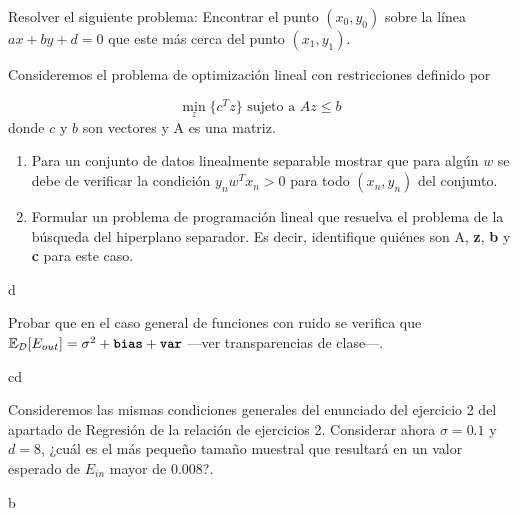 \documentclass[a4paper, 11pt]{article}
\begin{document}
      \begin{ejercicio}
        Resolver el siguiente problema: Encontrar el punto $(x_0,y_0)$ sobre la línea $ax+by+d=0$ que este más cerca del punto $(x_1,y_1)$.
        \item Consideremos el problema de optimización lineal con restricciones definido por

        \[
        \min_z \{c^Tz\} \textrm{ sujeto a } Az \leq b
        \]
        donde $c$ y $b$ son vectores y A es una matriz.

             \begin{enumerate}
                \item Para un conjunto de datos linealmente separable mostrar que para algún $w$ se debe de verificar la condición  $y_n w^T x_n > 0$ para todo $(x_n,y_n)$ del conjunto.
                \item Formular un problema de programación lineal que resuelva el problema de la búsqueda del hiperplano separador. Es decir, identifique quiénes son A, \textbf{z}, \textbf{b} y \textbf{c} para este caso.
            \end{enumerate}
      \end{ejercicio}

      \begin{solucion}
        d
      \end{solucion}

      \begin{ejercicio}
        Probar que en el caso general de funciones con ruido se verifica que $\mathbb{E}_{\mathcal{D}}[E_{out}]= \sigma^2+\texttt{\textbf{bias}}+\texttt{\textbf{var}}$ ---ver transparencias de clase---.
      \end{ejercicio}

      \begin{solucion}
        cd
      \end{solucion}

      \begin{ejercicio}
        \item  Consideremos las mismas condiciones generales del enunciado del ejercicio 2 del apartado de Regresión de la relación de ejercicios 2.
        Considerar ahora $\sigma=0.1$ y $d=8$, ¿cuál es el más pequeño tamaño muestral que resultará en un valor esperado de $E_{in}$ mayor de $0.008$?.
      \end{ejercicio}


      \begin{solucion}
        b
      \end{solucion}
\end{document}
